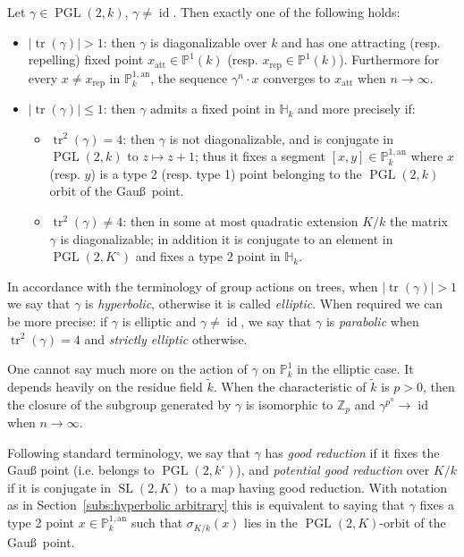 \documentclass[AHL,Unicode,longabstracts]{cedram}
\DeclareMathOperator{\tr}{tr}
\DeclareMathOperator{\id}{id}
\DeclareMathOperator{\SL}{SL}
\DeclareMathOperator{\PGL}{PGL}
\newcommand{\hh}{\mathbb{H}}
\newcommand{\Z}{{\mathbb Z}}
\newcommand{\an}{\mathrm{an}}
\newcommand{\PP}{\mathbb{P}}
\newcommand{\att}{\mathrm{att}}
\newcommand{\rep}{\mathrm{rep}}
\begin{document}
\begin{prop}\label{prop:claselt}
Let $\gamma\in \PGL(2,k)$, $\gamma\neq \id$. Then exactly one of the following holds:
\begin{itemize}
\item $\mathopen{|}\tr(\gamma)| >1$: then $\gamma$ is diagonalizable over $k$ and has one attracting (resp. repelling) fixed point $x_\att \in \PP^1(k)$ (resp. $x_\rep \in \PP^1(k)$). Furthermore for every $x\neq x_\rep$ in $\PP^{1,\an}_k$, the sequence $\gamma^n\cdot x $ converges to $ x_\att$ when $n\to\infty$.
\item $\mathopen{|}\tr(\gamma)| \leq 1$: then $\gamma$ admits a fixed point in $\hh_k$ and more precisely if:
\begin{itemize}
\item $\tr^2(\gamma) =4$: then $\gamma$ is not diagonalizable, and is conjugate in $\PGL(2,k)$ to $z\mapsto z+1$; thus it fixes a segment $[x,y] \in \PP^{1,\an}_k$ where $x$ (resp. $y$) is a type 2 (resp. type 1) point belonging to the $\PGL(2,k)$ orbit of the Gau\ss\ point.
\item $\tr^2(\gamma) \neq 4$: then in some at most quadratic extension $K/k$ the matrix $\gamma$ is diagonalizable; in addition it is conjugate to an element in $\PGL(2,K^\circ)$ and fixes a type $2$ point in $\hh_k$.
\end{itemize}
\end{itemize}
\end{prop}

In accordance with the terminology of group actions on trees, when $\mathopen{|}\tr(\gamma)| >1$ we say that $\gamma$ is \emph{hyperbolic}, otherwise it is called \emph{elliptic}. When required we can be more precise: if $\gamma$ is elliptic and $\gamma\neq \id$, we say that $\gamma$ is \emph{parabolic} when $\tr^2(\gamma) =4$ and \emph{strictly elliptic} otherwise.


One cannot say much more on the action of $\gamma$ on $\PP^1_k$ in the elliptic case. It depends heavily on the residue field $\widetilde{k}$. When the characteristic of $\widetilde{k}$ is $p>0$, then the closure of the subgroup generated by $\gamma$ is isomorphic to $\Z_p$ and $\gamma^{p^n} \to \id$ when $n\to\infty$.


Following standard terminology, we say that $\gamma$ has \emph{good reduction} if it fixes the Gau{\ss} point (i.e. belongs to $\PGL(2,k^\circ)$), and \emph{potential good reduction} over $K/k$ if it is conjugate in $\SL(2,K)$ to a map having good reduction. With notation as in Section~\ref{subs:hyperbolic arbitrary} this is equivalent to saying that $\gamma$ fixes a type 2 point $x\in \PP^{1,\an}_k$ such that $\sigma_{K/k}(x)$ lies in the $\PGL(2,K)$-orbit of the Gau\ss\ point.
\end{document}
